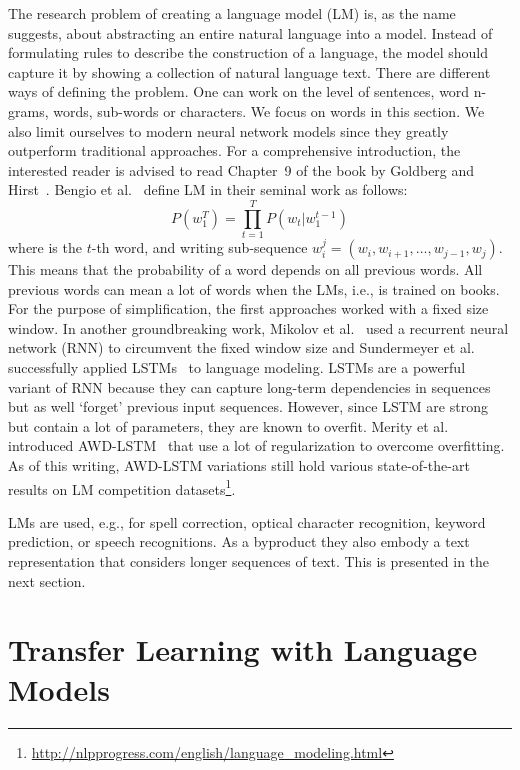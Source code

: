 The research problem of creating a language model (LM) is, as the name suggests, about abstracting an entire natural language into a model.
Instead of formulating rules to describe the construction of a language, the model should capture it by showing a collection of natural language text. There are different ways of defining the problem. One can work on the level of sentences, word n-grams, words, sub-words or characters. We focus on words in this section. We also limit ourselves to modern neural network models since they greatly outperform traditional approaches.
For a comprehensive introduction, the interested reader is advised to read Chapter~9 of the book by Goldberg and Hirst~\cite{Goldberg:2017:NNM:3110856}.
Bengio et al.~\cite{Bengio03aneural} define LM in their seminal work as follows:
\begin{equation*}
 P(w_{1}^{T})=\prod_{t=1}^{T} P(w_t|w_{1}^{t-1})
\end{equation*}
where is the $t$-th word, and writing sub-sequence $w_{i}^{j} = (w_{i}, w_{i+1},\ldots, w_{j-1}, w_{j})$. This means that the probability of a word depends on all previous words. All previous words can mean a lot of words when the LMs, i.e., is trained on books. For the purpose of simplification, the first approaches worked with a fixed size window. In another groundbreaking work, Mikolov et al.~\cite{conf/interspeech/MikolovKBCK10} used a recurrent neural network (RNN) to circumvent the fixed window size and Sundermeyer et al.~\cite{Sundermeyer2012LSTMNN} successfully applied LSTMs~\cite{Hochreiter:1997:LSM:1246443.1246450} to language modeling. LSTMs are a powerful variant of RNN because they can capture long-term dependencies in sequences but as well `forget' previous input sequences. However, since LSTM are strong but contain a lot of parameters, they are known to overfit. Merity et al. introduced AWD-LSTM~\cite{merityRegOpt} that use a lot of regularization to overcome overfitting. As of this writing, AWD-LSTM variations still hold various state-of-the-art results on LM competition datasets\footnote{\url{http://nlpprogress.com/english/language_modeling.html}}.

LMs are used, e.g., for spell correction, optical character recognition, keyword prediction, or speech recognitions. As a byproduct they also embody a text representation that considers longer sequences of text. This is presented in the next section.

\newpage

\section{Transfer Learning with Language Models}
\label{sec:bgrd_tlwlm}

